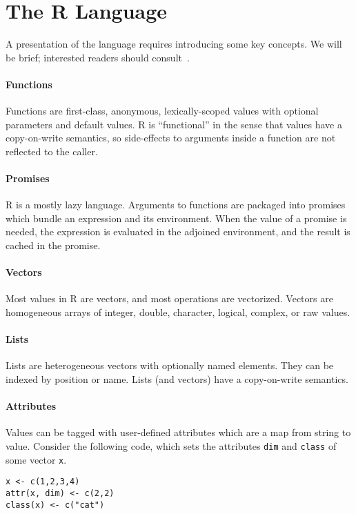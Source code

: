 \documentclass[sigplan,screen]{acmart}
\renewcommand{\c}[1]{\lstinline |#1|\xspace}
\begin{document}
\section{The R Language}

A presentation of the language requires introducing some key concepts. We will
be brief; interested readers should consult~\cite{AdvancedR}.

\paragraph{Functions} Functions are first-class, anonymous, lexically-scoped values
with optional parameters and default values. R is ``functional'' in the sense
that values have a copy-on-write semantics, so side-effects to arguments inside
a function are not reflected to the caller.

\paragraph{Promises} R is a mostly lazy language. Arguments to functions are
packaged into promises which bundle an expression and its environment. When the
value of a promise is needed, the expression is evaluated in the adjoined
environment, and the result is cached in the promise.

\paragraph{Vectors}  Most values in R are vectors, and most operations are
vectorized. Vectors are homogeneous arrays of integer, double, character,
logical, complex, or raw values.

\paragraph{Lists} Lists are heterogeneous vectors with optionally named elements.
They can be indexed by position or name. Lists (and vectors) have a
copy-on-write semantics.

\paragraph{Attributes}
Values can be tagged with user-defined attributes which are a map from string to
value. Consider the following code, which sets the attributes \c{dim} and
\c{class} of some vector \c{x}.

\begin{lstlisting}
x <- c(1,2,3,4)
attr(x, dim) <- c(2,2)
class(x) <- c("cat")
\end{lstlisting}
\end{document}
